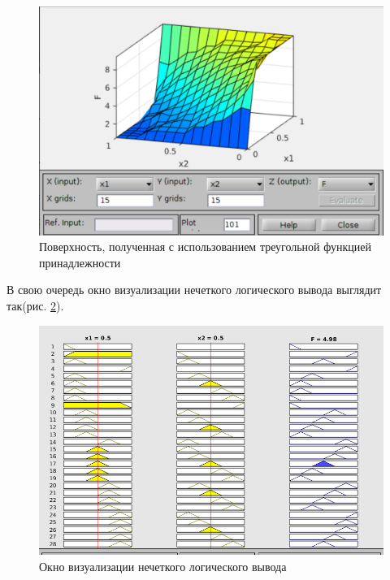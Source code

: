 \documentclass[11pt,a4paper]{report}
\newcommand{\insref}[1]{рис. \ref{#1}}
\begin{document}
	\begin{figure}[!hbtp]
		\centering
		\includegraphics[width=\linewidth]{trim_surf.png}
		\caption{Поверхность, полученная с использованием треугольной функцией принадлежности}
		\label{fig:trim_surf}
	\end{figure}
	\newline
	В свою очередь окно визуализации нечеткого логического вывода выглядит так(\insref{fig:logoutput_trimf}).
	\begin{figure}[!hbtp]
		\centering
		\includegraphics[width=\linewidth]{logoutput_trimf.png}
		\caption{Окно визуализации нечеткого логического вывода}
		\label{fig:logoutput_trimf}
	\end{figure}
	\newpage
\end{document}
